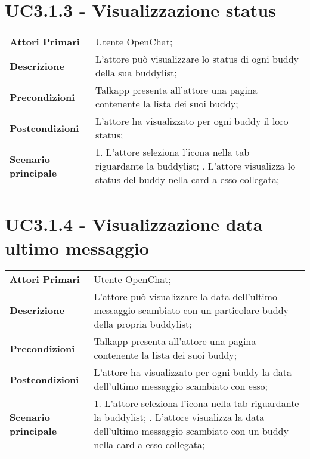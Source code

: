\section{UC3.1.3 - Visualizzazione status}
\begin{center}
	\bgroup
	\def\arraystretch{1.8}     
	\begin{longtable}{  p{4cm} | p{9.5cm} } 
		\textbf{Attori Primari} & Utente OpenChat; \\ 
		\textbf{Descrizione} &  L'attore può visualizzare lo status di ogni buddy della sua buddylist; \\ 
		\textbf{Precondizioni}  & Talkapp presenta all'attore una pagina contenente la lista dei suoi buddy; \\
		\textbf{Postcondizioni} & L'attore ha visualizzato per ogni buddy  il loro status;  \\ 
		\textbf{Scenario principale} & 
		1. L'attore seleziona l'icona nella tab riguardante la buddylist; \newline
		2. L'attore visualizza lo status del buddy nella card a esso collegata;
	\end{longtable}
	\egroup
\end{center}
\section{UC3.1.4 - Visualizzazione data ultimo messaggio}
\begin{center}
	\bgroup
	\def\arraystretch{1.8}     
	\begin{longtable}{  p{4cm} | p{9.5cm} } 
		\textbf{Attori Primari} & Utente OpenChat; \\ 
		\textbf{Descrizione} &  L'attore può visualizzare la data dell'ultimo messaggio scambiato con un particolare buddy della propria buddylist; \\ 
		\textbf{Precondizioni}  & Talkapp presenta all'attore una pagina contenente la lista dei suoi buddy; \\
		\textbf{Postcondizioni} & L'attore ha visualizzato per ogni buddy  la data dell'ultimo messaggio scambiato con esso;  \\ 
		\textbf{Scenario principale} & 
		1. L'attore seleziona l'icona nella tab riguardante la buddylist; \newline
		2. L'attore visualizza la data dell'ultimo messaggio scambiato con un buddy nella card a esso collegata;
	\end{longtable}
	\egroup
\end{center}

